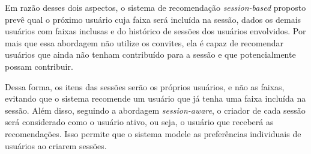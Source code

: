 Em razão desses dois aspectos, o sistema de recomendação \textit{session-based}
proposto prevê qual o próximo usuário cuja faixa será incluída na sessão, dados
os demais usuários com faixas inclusas e do histórico de sessões dos usuários
envolvidos. Por mais que essa abordagem não utilize os convites, ela é capaz de
recomendar usuários que ainda não tenham contribuído para a sessão e que
potencialmente possam contribuir.

Dessa forma, os itens das sessões serão os próprios usuários, e não as faixas,
evitando que o sistema recomende um usuário que já tenha uma faixa incluída na
sessão. Além disso, seguindo a abordagem \textit{session-aware}, o criador de
cada sessão será considerado como o usuário ativo, ou seja, o usuário que
receberá as recomendações. Isso permite que o sistema modele as preferências
individuais de usuários ao criarem sessões.



